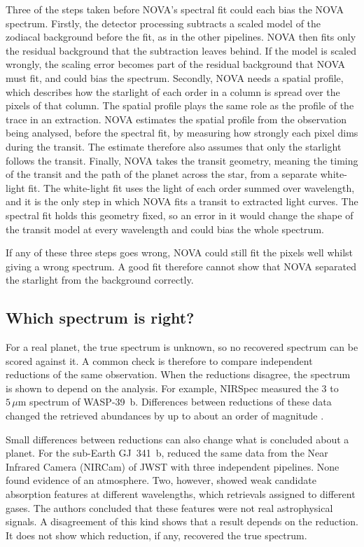 Three of the steps taken before NOVA's spectral fit could each bias the NOVA spectrum. Firstly, the detector processing subtracts a
scaled model of the zodiacal background before the fit, as in the other
pipelines. NOVA then fits only the residual background that the subtraction
leaves behind. If the model is scaled wrongly, the scaling error becomes part
of the residual background that NOVA must fit, and could bias the spectrum. Secondly, NOVA needs a spatial profile, which describes how the
starlight of each order in a column is spread over the pixels of that column.
The spatial profile plays the same role as the profile of the trace in an
extraction. NOVA estimates the spatial profile from the observation being analysed,
before the spectral fit, by measuring how strongly each pixel dims during the
transit. The estimate therefore also assumes that only the starlight follows
the transit. Finally, NOVA takes the transit geometry, meaning the timing of
the transit and the path of the planet across the star, from a separate
white-light fit. The white-light fit uses the light of each order summed over
wavelength, and it is the only step in which NOVA fits a transit to extracted light curves. The spectral fit holds this geometry fixed, so an error in it would change the shape of the transit model at every wavelength and could bias the whole spectrum.

If any of these three steps goes wrong, NOVA could still fit the pixels well
whilst giving a wrong spectrum. A good fit therefore cannot show that NOVA
separated the starlight from the background correctly. 

\subsection{Which spectrum is right?}
\label{sec:validation-problem}

For a real planet, the true spectrum is unknown, so no recovered spectrum can
be scored against it. A common check is therefore to compare independent
reductions of the same observation. When the reductions disagree, the
spectrum is shown to depend on the analysis. For example, NIRSpec measured the 3 to $5\,\mu\mathrm{m}$ spectrum of
WASP-39~b. Differences between reductions of these data changed the
retrieved abundances by up to about an order of magnitude
\citep{ConstantinouEtAl2023}.

Small differences between reductions can also change what is concluded about
a planet. For the sub-Earth GJ~341~b, \citet{KirkEtAl2024} reduced the same data from the Near Infrared Camera (NIRCam) of JWST with three
independent pipelines. None found evidence of an atmosphere. Two, however, showed weak candidate absorption features at different wavelengths, which retrievals assigned to different gases. The authors concluded that these features were not real astrophysical signals. A
disagreement of this kind shows that a result depends on the reduction. It
does not show which reduction, if any, recovered the true spectrum.

